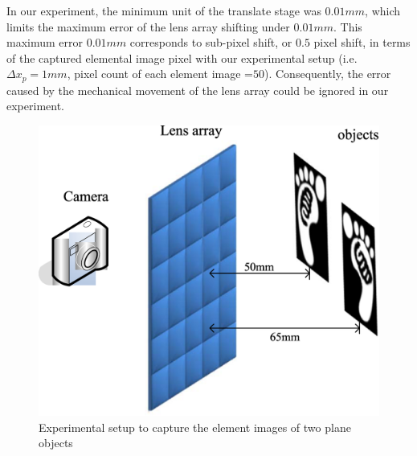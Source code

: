 \documentclass[10pt,letterpaper]{article}
\begin{document}
In our experiment, the minimum unit of the translate stage was $0.01 mm$, which limits the maximum error of the lens array shifting under $0.01mm$. This maximum error $0.01mm$ corresponds to sub-pixel shift, or $0.5$ pixel shift, in terms of the captured elemental image pixel with our experimental setup (i.e. $\Delta x_p=1mm$, pixel count of each element image =$50$). Consequently, the error caused by the mechanical movement of the lens array could be ignored in our experiment.
\begin{figure}[!htb]
\centering\includegraphics[width=.4\columnwidth]{fig_15}
\caption{Experimental setup to capture the element images of two plane objects}
\label{fig_15}
\end{figure}
\end{document}
